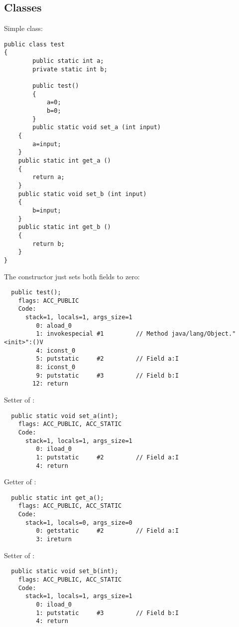 \subsection{Classes}

Simple class:

\begin{lstlisting}[caption=test.java,style=customjava]
public class test
{
        public static int a;
        private static int b;

        public test()
        {
            a=0;
            b=0;
        }
        public static void set_a (int input)
	{
		a=input;
	}
	public static int get_a ()
	{
		return a;
	}
	public static void set_b (int input)
	{
		b=input;
	}
	public static int get_b ()
	{
		return b;
	}
}
\end{lstlisting}

The constructor just sets both fields to zero:


\begin{lstlisting}
  public test();
    flags: ACC_PUBLIC
    Code:
      stack=1, locals=1, args_size=1
         0: aload_0       
         1: invokespecial #1         // Method java/lang/Object."<init>":()V
         4: iconst_0      
         5: putstatic     #2         // Field a:I
         8: iconst_0      
         9: putstatic     #3         // Field b:I
        12: return        
\end{lstlisting}
        
Setter of :

\begin{lstlisting}
  public static void set_a(int);
    flags: ACC_PUBLIC, ACC_STATIC
    Code:
      stack=1, locals=1, args_size=1
         0: iload_0       
         1: putstatic     #2         // Field a:I
         4: return        
\end{lstlisting}

Getter of :

\begin{lstlisting}
  public static int get_a();
    flags: ACC_PUBLIC, ACC_STATIC
    Code:
      stack=1, locals=0, args_size=0
         0: getstatic     #2         // Field a:I
         3: ireturn       
\end{lstlisting}

Setter of :

\begin{lstlisting}
  public static void set_b(int);
    flags: ACC_PUBLIC, ACC_STATIC
    Code:
      stack=1, locals=1, args_size=1
         0: iload_0       
         1: putstatic     #3         // Field b:I
         4: return        
\end{lstlisting}

